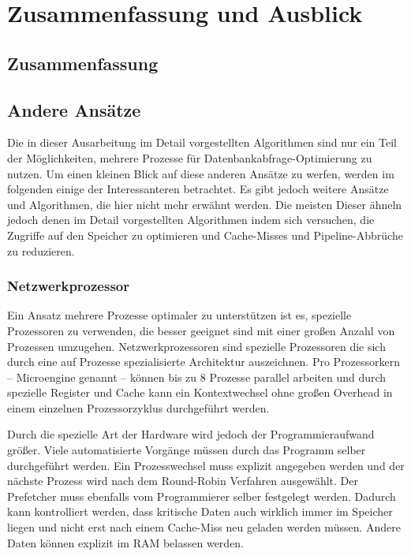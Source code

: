 \chapter{Zusammenfassung und Ausblick}
\label{sec:Zusammenfassung-Ausblick}

\section{Zusammenfassung}
\label{sec:Zusammenfassung}

\section{Andere Ansätze}
\label{sec:AndereAnsatze}
Die in dieser Ausarbeitung im Detail vorgestellten Algorithmen sind nur ein Teil der Möglichkeiten, mehrere Prozesse für Datenbankabfrage-Optimierung zu nutzen. Um einen kleinen Blick auf diese anderen Ansätze zu werfen, werden im folgenden einige der Interessanteren betrachtet. Es gibt jedoch weitere Ansätze und Algorithmen, die hier nicht mehr erwähnt werden. Die meisten Dieser ähneln jedoch denen im Detail vorgestellten Algorithmen indem sich versuchen, die Zugriffe auf den Speicher zu optimieren und Cache-Misses und Pipeline-Abbrüche zu reduzieren.

\subsection{Netzwerkprozessor}
\label{sec:Netzwerkprozessor}

Ein Ansatz mehrere Prozesse optimaler zu unterstützen ist es, spezielle Prozessoren zu verwenden, die besser geeignet sind mit einer großen Anzahl von Prozessen umzugehen. \cite{GOLD} Netzwerkprozessoren sind spezielle Prozessoren die sich durch eine auf Prozesse spezialisierte Architektur auszeichnen. Pro Prozessorkern – Microengine genannt – können bis zu 8 Prozesse parallel arbeiten und durch spezielle Register und Cache kann ein Kontextwechsel ohne großen Overhead in einem einzelnen Prozessorzyklus durchgeführt werden.

Durch die spezielle Art der Hardware wird jedoch der Programmieraufwand größer. Viele automatisierte Vorgänge müssen durch das Programm selber durchgeführt werden. Ein Prozesswechsel muss explizit angegeben werden und der nächste Prozess wird nach dem Round-Robin Verfahren ausgewählt. Der Prefetcher muss ebenfalls vom Programmierer selber festgelegt werden. Dadurch kann kontrolliert werden, dass kritische Daten auch wirklich immer im Speicher liegen und nicht erst nach einem Cache-Miss neu geladen werden müssen. Andere Daten können explizit im RAM belassen werden.

